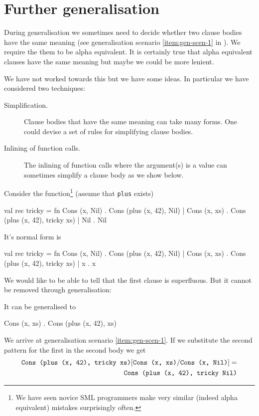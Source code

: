 \section{Further generalisation}
During generalisation we sometimes need to decide whether two clause bodies have
the same meaning (see generalisation scenario \ref{item:gen-scen-1} in
). We require the them to be alpha equivalent. It is
certainly true that alpha equivalent clauses have the same meaning but maybe we
could be more lenient.

We have not worked towards this but we have some ideas. In particular we have
considered two techniques:
\begin{description}
\item[Simplification.] Clause bodies that have the same meaning can take many
  forms. One could devise a set of rules for simplifying clause bodies.
\item[Inlining of function calls.] The inlining of function calls where the
  argument(s) is a value can sometimes simplify a clause body as we show below.
\end{description}

Consider the function\footnote{We have seen novice SML programmers make very
  similar (indeed alpha equivalent) mistakes surprisingly often.} (assume that
\texttt{plus} exists)
\begin{sml}
val rec tricky =
fn Cons (x, Nil) . Cons (plus (x, 42), Nil)
 | Cons (x, xs)  . Cons (plus (x, 42), tricky xs)
 | Nil           . Nil
\end{sml}

It's normal form is

\begin{sml}
val rec tricky =
fn Cons (x, Nil) . Cons (plus (x, 42), Nil)
 | Cons (x, xs)  . Cons (plus (x, 42), tricky xs)
 | x             . x
\end{sml}

We would like to be able to tell that the first clause is superfluous. But it
cannot be removed through generalisation:

It can be generalised to

\begin{sml}
Cons (x, xs) . Cons (plus (x, 42), xs)
\end{sml}

We arrive at generalisation scenario \ref{item:gen-scen-1}. If we substitute
the second pattern for the first in the second body we get
\begin{eqnarray*}
\texttt{Cons (plus (x, 42), tricky xs)}[\texttt{Cons (x, xs)}/\texttt{Cons (x, Nil)}] =\\
\texttt{Cons (plus (x, 42), tricky Nil)}
\end{eqnarray*}

